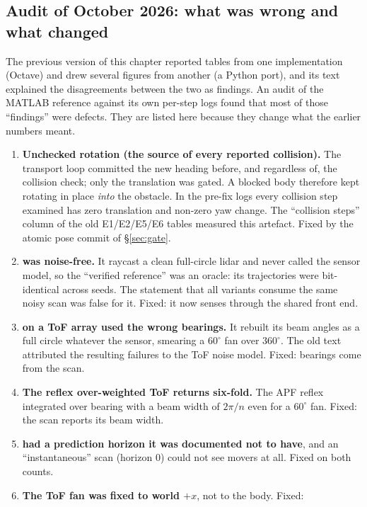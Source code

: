 \subsection{Audit of October 2026: what was wrong and what changed}
\label{sec:audit}

The previous version of this chapter reported tables from one
implementation (Octave) and drew several figures from another (a Python
port), and its text explained the disagreements between the two as findings.
An audit of the MATLAB reference against its own per-step logs found that
most of those ``findings'' were defects. They are listed here because they
change what the earlier numbers meant.

\begin{enumerate}[leftmargin=1.9em]
\item \textbf{Unchecked rotation (the source of every reported collision).}
The transport loop committed the new heading before, and regardless of, the
collision check; only the translation was gated. A blocked body therefore
kept rotating in place \emph{into} the obstacle. In the pre-fix logs every
collision step examined has zero translation and non-zero yaw change. The
``collision steps'' column of the old E1/E2/E5/E6 tables measured this
artefact. Fixed by the atomic pose commit of \S\ref{sec:gate}.
\item \textbf{ was noise-free.} It raycast a clean
full-circle lidar and never called the sensor model, so the ``verified
reference'' was an oracle: its trajectories were bit-identical across seeds.
The statement that all variants consume the same noisy scan was false for
it. Fixed: it now senses through the shared front end.
\item \textbf{ on a ToF array used the wrong bearings.} It
rebuilt its beam angles as a full circle whatever the sensor, smearing a
$60^\circ$ fan over $360^\circ$. The old text attributed the resulting
failures to the ToF noise model. Fixed: bearings come from the scan.
\item \textbf{The reflex over-weighted ToF returns six-fold.} The APF
reflex integrated over bearing with a beam width of $2\pi/n$ even for a
$60^\circ$ fan. Fixed: the scan reports its beam width.
\item \textbf{ had a prediction horizon it was documented not
to have}, and an ``instantaneous'' scan (horizon $0$) could not see movers
at all. Fixed on both counts.
\item \textbf{The ToF fan was fixed to world $+x$}, not to the body. Fixed:

\end{enumerate}
